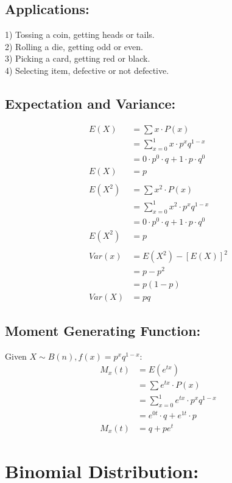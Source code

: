 \documentclass[
10pt, %
a4paper, %
]{report}
\begin{document}
\subsection*{Applications:}
1) Tossing a coin, getting heads or tails. \\
2) Rolling a die, getting odd or even. \\
3) Picking a card, getting red or black. \\
4) Selecting item, defective or not defective.

\subsection*{Expectation and Variance:}
\begin{align*}
    E(X) &= \sum x \cdot P(x) \\
         &= \sum_{x=0}^1 x\cdot p^x q^{1-x} \\
         &= 0\cdot p^0 \cdot q + 1\cdot p \cdot q^0 \\
    E(X) &= p \\ \\
    E(X^2) &= \sum x^2 \cdot P(x) \\
           &= \sum_{x=0}^1 x^2\cdot p^x q^{1-x} \\
           &= 0\cdot p^0 \cdot q + 1\cdot p \cdot q^0 \\
    E(X^2) &= p \\ \\
    Var(x) &= E(X^2) - [E(X)]^2 \\
           &= p-p^2 \\
           &= p(1-p) \\
    Var(X) &= pq
\end{align*}

\subsection*{Moment Generating Function:}
Given \(X \sim B(n), f(x)=p^x q^{1-x}:\)
\begin{align*}
    M_x(t) &= E(e^{tx}) \\
           &= \sum e^{tx} \cdot P(x) \\
           &= \sum_{x=0}^1 e^{tx} \cdot p^x q^{1-x} \\
           &= e^{0t} \cdot q + e^{1t} \cdot p\\
    M_x(t) &= q+pe^t
\end{align*}
\newpage

\section*{Binomial Distribution:}
\end{document}
